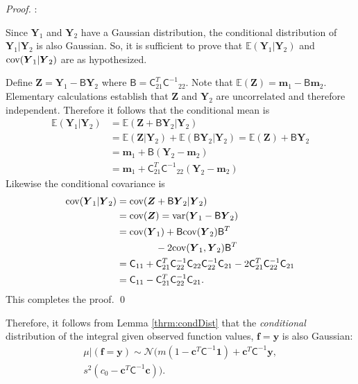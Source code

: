 \documentclass[twocolumn]{svjour3}          %
\newcommand{\bm}[1]{\boldsymbol{#1}}
\newcommand{\mB}{\mathsf{B}}
\newcommand{\Ex}{\mathbb{E}}
\newcommand{\vc}{\bm{c}}
\newcommand{\vf}{\bm{f}}
\newcommand{\vm}{\bm{m}}
\newcommand{\vy}{\bm{y}}
\newcommand{\vY}{\bm{Y}}
\newcommand{\vZ}{\bm{Z}}
\newcommand{\vone}{\bm{1}}
\newcommand{\mC}{\mathsf{C}}
\newcommand{\mCInv}{{\mathsf{C}^{-1}}}
\newcommand{\cov}{{\textup{cov}}}
\newcommand{\var}{{\textup{var}}}
\newcommand{\calN}{\mathcal{N}}
\begin{document}
\begin{proof}:

	
	Since $\vY_1$ and $\vY_2$ have a Gaussian distribution, the conditional distribution of $\vY_1 \vert \vY_2$ is also Gaussian. So, it is sufficient to prove that $\Ex(\vY_1 \vert \vY_2)$ and $\cov(\vY_1 \vert \vY_2)$ are as hypothesized.
	
	Define $\vZ=\vY_1- \mB \vY_2$ where $\mB=\mC_{21}^T \mCInv_{22}$. Note that $\Ex(\vZ) = \vm_1 - \mB \vm_2$.  Elementary calculations establish that $\vZ$ and $\vY_2$ are uncorrelated and therefore independent.   Therefore it follows that the conditional mean is
	\begin{align*}
	\Ex(\vY_1 \vert \vY_2) &= \Ex(\vZ + \mB \vY_2 \vert \vY_2) 
	\\ & = \Ex(\vZ \vert \vY_2) + \Ex(\mB \vY_2 \vert \vY_2) 
	= \Ex(\vZ) + \mB\vY_2 
	\\
	& = \vm_1 + \mB (\vY_2 - \vm_2) \\
	& =  \vm_1+ \mC_{21}^T \mCInv_{22}(\vY_2 - \vm_2)
	\end{align*}
	Likewise the conditional covariance is 
	\begin{align*}
	\cov(\vY_1|\vY_2) &=\cov(\vZ + \mB \vY_2|\vY_2) \\
	& =\cov(\vZ) = \var(\vY_1 - \mB \vY_2)
	\\
	& =\cov(\vY_1)+\mB\cov(\vY_2)\mB^T \\
	& \qquad  \qquad  - 2  \cov(\vY_1,\vY_2) \mB^T
	\\
	&=\mC_{11}+\mC_{21}^T\mC_{22}^{-1}\mC_{22}\mC_{22}^{-1}\mC_{21}-2\mC_{21}^T\mC_{22}^{-1}\mC_{21}
	\\
	&=\mC_{11}-\mC_{21}^T\mC_{22}^{-1}\mC_{21}.
	\end{align*}
	This completes the proof. \qed

	
\end{proof}
\fi

Therefore,  it follows from Lemma \ref{thrm:condDist} that the \emph{conditional} distribution of the integral given observed function values, $\vf = \vy$ is also Gaussian:
\begin{multline} \label{eqn:condInteg}
\mu | (\vf = \vy) \sim \calN \bigl(m (1 - \vc^T \mC^{-1} \vone)  + \vc^T \mC^{-1} \vy, 
\\
s^2(c_0  -\vc ^T \mC^{-1} \vc) \bigr).
\end{multline}
\end{document}

